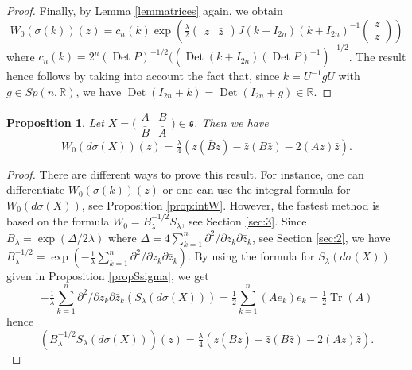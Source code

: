 \documentclass[12pt]{amsart}
\numberwithin{equation}{section}
\newtheorem{proposition}[theorem]{Proposition}
\DeclareMathOperator{\Det}{Det} \DeclareMathOperator{\Tr}{Tr}
\begin{document}
\begin{proof}
Finally, by Lemma  \ref{lemmatrices} again, we obtain 
\begin{equation*}W_0(\sigma(k))(z)=c_n(k) \exp \left( \tfrac{\lambda}{2}
\begin{pmatrix}z&{\bar z}\end{pmatrix}J(k-I_{2n})
(k+I_{2n})^{-1}\begin{pmatrix}z\\{\bar z}\end{pmatrix}\right)\end{equation*}
where $c_n(k)=2^n(\Det P)^{-1/2}((\Det (k+I_{2n})(\Det P)^{-1})^{-1/2}$.
The result hence follows by taking into account the fact that, since $k=U^{-1}gU$ with
$g\in Sp(n,{\mathbb R})$, we have $\Det(I_{2n}+k)=\Det(I_{2n}+g)\in {\mathbb R}$. 
\end{proof}

\begin{proposition}\label{propW0dsigma} Let $X=\bigl(\begin{smallmatrix} A&B\\
{\bar B}&{\bar A} \end{smallmatrix}\bigr)\in {\mathfrak s}$. Then we have
\begin{equation*}W_0(d\sigma(X))(z)=\tfrac{\lambda}{4}(z({\bar B}z)-{\bar z}(B{\bar z})-2(Az){\bar z}).
\end{equation*}
\end{proposition}

\begin{proof}There are different ways to prove this result. For instance, one can differentiate
$W_0(\sigma(k))(z)$ or one can use the integral formula for $W_0(d\sigma(X))$, see Proposition \ref{prop:intW}. However, the fastest method is based on the formula $W_0=
B_{\lambda}^{-1/2}S_{\lambda}$, see Section \ref{sec:3}.
Since $B_{\lambda}=\exp (\Delta/2\lambda)$ where
$\Delta=4\sum_{k=1}^n\partial^2/\partial z_k\partial {\bar z}_k$, see Section \ref{sec:2},
we have $B_{\lambda}^{-1/2}=\exp (-\tfrac{1}{\lambda}\sum_{k=1}^n\partial^2/\partial z_k\partial {\bar z}_k)$. By using the formula for $S_{\lambda}(d\sigma(X))$ given in Proposition \ref{propSsigma}, we get
\begin{equation*}-\tfrac{1}{\lambda}\sum_{k=1}^n\partial^2/\partial z_k\partial {\bar z}_k
(S_{\lambda}(d\sigma(X)))=\tfrac{1}{2}\sum_{k=1}^n(Ae_k)e_k=\tfrac{1}{2}\Tr(A)\end{equation*} hence
\begin{equation*}(B_{\lambda}^{-1/2}S_{\lambda}(d\sigma(X)))(z)=\tfrac{\lambda}{4}(z({\bar B}z)-{\bar z}(B{\bar z})-2(Az){\bar z}).
\end{equation*} 
\end{proof}
\end{document}
